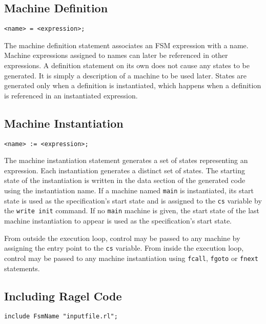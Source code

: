 \documentclass[letterpaper,11pt,oneside]{book}
\newcommand{\verbspace}{\vspace{10pt}}
\begin{document}
\subsection{Machine Definition}
\label{definition}

\begin{verbatim}
<name> = <expression>;
\end{verbatim}
\verbspace

The machine definition statement associates an FSM expression with a name. Machine
expressions assigned to names can later be referenced in other expressions. A
definition statement on its own does not cause any states to be generated. It is simply a
description of a machine to be used later. States are generated only when a definition is
instantiated, which happens when a definition is referenced in an instantiated
expression. 

\subsection{Machine Instantiation}
\label{instantiation}

\begin{verbatim}
<name> := <expression>;
\end{verbatim}
\verbspace

The machine instantiation statement generates a set of states representing an
expression. Each instantiation generates a distinct set of states.  The starting
state of the instantiation is written in the data section of the generated code
using the instantiation name.  If a machine named
\verb|main| is instantiated, its start state is used as the
specification's start state and is assigned to the \verb|cs| variable by the
\verb|write init| command. If no \verb|main| machine is given, the start state
of the last machine instantiation to appear is used as the specification's
start state.

From outside the execution loop, control may be passed to any machine by
assigning the entry point to the \verb|cs| variable.  From inside the execution
loop, control may be passed to any machine instantiation using \verb|fcall|,
\verb|fgoto| or \verb|fnext| statements.

\subsection{Including Ragel Code}

\begin{verbatim}
include FsmName "inputfile.rl";
\end{verbatim}
\verbspace
\end{document}
